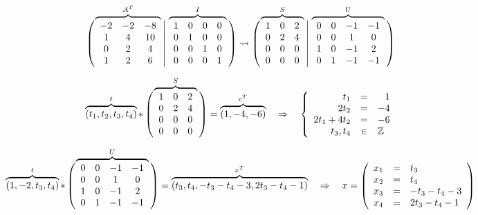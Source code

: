 
\def\AT{%
\begin{array}{ccc}
-2 & -2 & -8 \\
 1 &  4 & 10 \\
 0 &  2 &  4 \\
 1 &  2 &  6
\end{array}
}%
\def\I{%
\begin{array}{cccc}
 1 &  0 &  0 &  0 \\
 0 &  1 &  0 &  0 \\
 0 &  0 &  1 &  0 \\
 0 &  0 &  0 &  1
\end{array}
}%
\def\S{%
\begin{array}{ccc}
 1 &  0 &  2 \\
 0 &  2 &  4 \\
 0 &  0 &  0 \\
 0 &  0 &  0
\end{array}
}%
\def\U{%
\begin{array}{cccc}
  0 &  0 & -1 & -1 \\
  0 &  0 &  1 &  0 \\
  1 &  0 & -1 &  2 \\
  0 &  1 & -1 & -1
\end{array}
}%

\[
\left(\vphantom{\AT}\right.\kern-2\nulldelimiterspace
\overbrace{\AT}^{A^T}\kern-\nulldelimiterspace
\left.\middle|\vphantom{\AT}\right.
\overbrace{\I}^{I}\kern-\nulldelimiterspace
\left.\vphantom{\AT}\right)
\leadsto
\left(\vphantom{\S}\right.\kern-2\nulldelimiterspace
\overbrace{\S}^{S}\kern-\nulldelimiterspace
\left.\middle|\vphantom{\S}\right.
\overbrace{\U}^{U}\kern-\nulldelimiterspace
\left.\vphantom{\S}\right)
\]

\[
\overbrace{
(t_1, t_2, t_3, t_4)
}^t
*
\left(\vphantom{\S}\right.\kern-2\nulldelimiterspace
\overbrace{\S}^{S}\kern-\nulldelimiterspace
\left.\vphantom{\S}\right)
=
\overbrace{
(1, -4, -6)
}^{c^T}
\quad \Rightarrow \quad
\left\lbrace
\begin{array}{rcl}
t_1 &=& \hphantom{-}1 \\
2t_2 &=& -4 \\
2t_1 + 4t_2 &=& -6\\
t_3, t_4 &\in& \mathbb{Z}
\end{array}
\right.
\]

\[
\overbrace{
(1, -2, t_3, t_4)
}^t
*
\left(\vphantom{\U}\right.\kern-2\nulldelimiterspace
\overbrace{\U}^{U}\kern-\nulldelimiterspace
\left.\vphantom{\S}\right)
=
\overbrace{
(t_3, t_4, -t_3-t_4-3, 2t_3-t_4-1)
}^{x^T}
\quad \Rightarrow \quad
x=
\left(
\begin{array}{rcl}
x_1 &=& t_3 \\
x_2 &=& t_4 \\
x_3 &=& -t_3-t_4-3 \\
x_4 &=& 2t_3-t_4-1 \\
\end{array}
\right)
\]